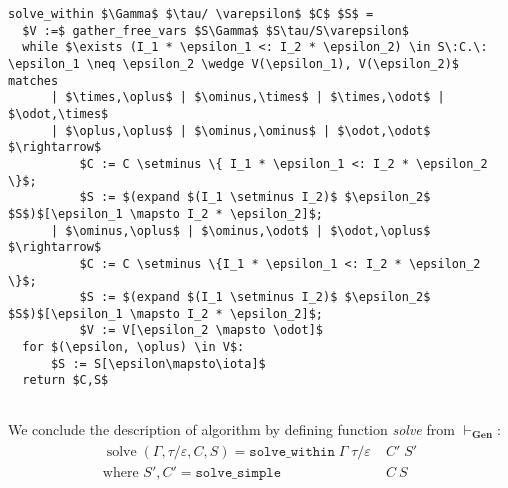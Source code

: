 \documentclass[declaration,shortabstract]{iithesis}
\theoremstyle{definition} \newtheorem{definition}{Definition}[section]
\begin{document}
\begin{lstlisting}
solve_within $\Gamma$ $\tau/ \varepsilon$ $C$ $S$ =
  $V :=$ gather_free_vars $S\Gamma$ $S\tau/S\varepsilon$
  while $\exists (I_1 * \epsilon_1 <: I_2 * \epsilon_2) \in S\:C.\: \epsilon_1 \neq \epsilon_2 \wedge V(\epsilon_1), V(\epsilon_2)$ matches
      | $\times,\oplus$ | $\ominus,\times$ | $\times,\odot$ | $\odot,\times$
      | $\oplus,\oplus$ | $\ominus,\ominus$ | $\odot,\odot$ $\rightarrow$
          $C := C \setminus \{ I_1 * \epsilon_1 <: I_2 * \epsilon_2 \}$;
          $S := $(expand $(I_1 \setminus I_2)$ $\epsilon_2$ $S$)$[\epsilon_1 \mapsto I_2 * \epsilon_2]$;
      | $\ominus,\oplus$ | $\ominus,\odot$ | $\odot,\oplus$ $\rightarrow$
          $C := C \setminus \{I_1 * \epsilon_1 <: I_2 * \epsilon_2 \}$;
          $S := $(expand $(I_1 \setminus I_2)$ $\epsilon_2$ $S$)$[\epsilon_1 \mapsto I_2 * \epsilon_2]$;
          $V := V[\epsilon_2 \mapsto \odot]$
  for $(\epsilon, \oplus) \in V$:
      $S := S[\epsilon\mapsto\iota]$
  return $C,S$
  
\end{lstlisting}
We conclude the description of algorithm by
defining function \textit{solve} from $\vdash_\textbf{Gen}$:
\begin{gather*}\begin{aligned}
\operatorname{solve}(\Gamma, \tau/\varepsilon, C, S) = 
    \texttt{solve\_within}\;\Gamma\;\tau / \varepsilon\;& C'\;S' \\
    \text{where } S', C' = \texttt{solve\_simple}\;& C\:S 
\end{aligned}
\end{gather*}
\vfill
\end{document}
